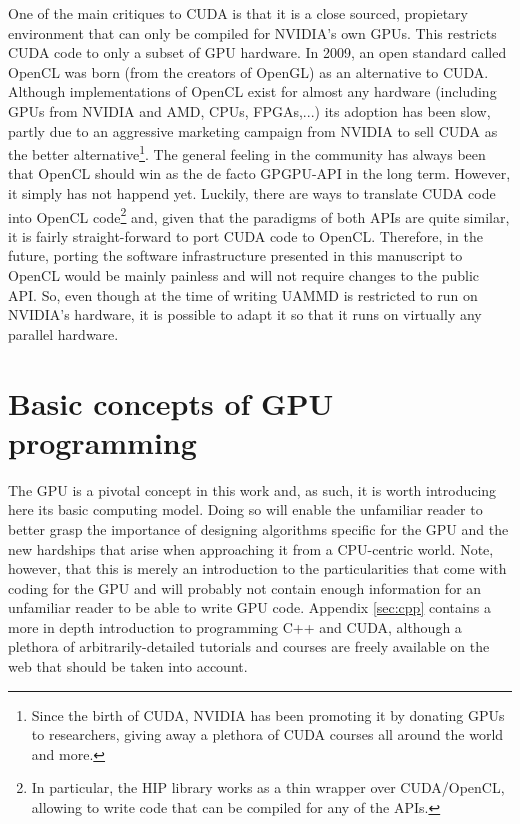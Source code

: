 \documentclass[ twoside,openright,titlepage,numbers=noenddot,%
headinclude,footinclude,cleardoublepage=empty,abstract=on,
BCOR=5mm,paper=a4,fontsize=11pt, dvipsnames
]{scrreprt}
\newcommand{\uammd}{\gls{UAMMD}\xspace}
\newcommand{\gpu}{\gls{GPU}\xspace}
\begin{document}
One of the main critiques to CUDA is that it is a close sourced, propietary environment that can only be compiled for NVIDIA's own \glspl{GPU}. This restricts CUDA code to only a subset of \gpu hardware.
In 2009, an open standard called OpenCL\cite{Stone2010} was born (from the creators of OpenGL) as an alternative to CUDA. Although implementations of OpenCL exist for almost any hardware (including GPUs from NVIDIA and AMD, CPUs, FPGAs,...) its adoption has been slow, partly due to an aggressive marketing campaign from NVIDIA to sell CUDA as the better alternative\footnote{Since the birth of CUDA, NVIDIA has been promoting it by donating GPUs to researchers, giving away a plethora of CUDA courses all around the world and more.}. The general feeling in the community has always been that OpenCL should win as the de facto \gls{GPGPU}-\gls{API} in the long term. However, it simply has not happend yet.
Luckily, there are ways to translate CUDA code into OpenCL code\footnote{In particular, the HIP library works as a thin wrapper over CUDA/OpenCL, allowing to write code that can be compiled for any of the \glspl{API}.} and, given that the paradigms of both \glspl{API} are quite similar, it is fairly straight-forward to port CUDA code to OpenCL. Therefore, in the future, porting the software infrastructure presented in this manuscript to OpenCL would be mainly painless and will not require changes to the public \gls{API}. So, even though at the time of writing \uammd is restricted to run on NVIDIA's hardware, it is possible to adapt it so that it runs on virtually any parallel hardware.

\section{Basic concepts of GPU programming}
The \gpu is a pivotal concept in this work and, as such, it is worth introducing here its basic computing model. Doing so will enable the unfamiliar reader to better grasp the importance of designing algorithms specific for the \gpu and the new hardships that arise when approaching it from a CPU-centric world. Note, however, that this is merely an introduction to the particularities that come with coding for the \gpu and will probably not contain enough information for an unfamiliar reader to be able to write \gpu code. Appendix \ref{sec:cpp} contains a more in depth introduction to programming C++ and CUDA, although a plethora of arbitrarily-detailed tutorials and courses are freely available on the web that should be taken into account.
\end{document}

